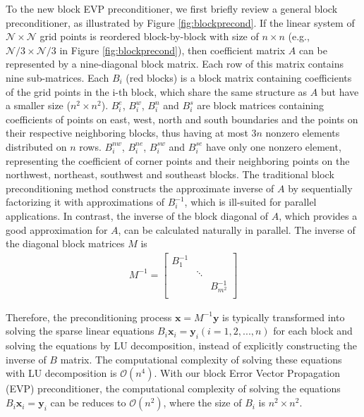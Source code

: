 To the new block EVP preconditioner, we first briefly review a general block preconditioner, as illustrated by Figure \ref{fig:blockprecond}.  If the linear system of $\mathcal{N} \times \mathcal{N}$ grid points is reordered block-by-block with size of $n\times n$ (e.g., $\mathcal{N}/3\times \mathcal{N}/3$ in Figure \ref{fig:blockprecond}), then coefficient matrix $A$ can be represented by a nine-diagonal block matrix. Each row of this matrix contains nine sub-matrices.  Each $B_i$ (red blocks) is a block matrix containing coefficients of the grid points in the i-th block, which share the same structure as $A$ but have a smaller size ($n^2\times n^2$).  $B_i^e$, $B_i^w$, $B_i^n$ and $B_i^s$ are block matrices containing coefficients of points on east, west, north and south boundaries and the points on their respective neighboring blocks, thus having at most $3n$ nonzero elements distributed on $n$ rows. $B_i^{nw}$, $B_i^{ne}$, $B_i^{sw}$ and $B_i^{se}$ have only one nonzero element, representing the coefficient of corner points and their neighboring points on the northwest, northeast, southwest and southeast blocks.  The traditional block preconditioning method constructs the approximate inverse of $A$ by sequentially factorizing it with approximations of $B_i^{-1}$, which is ill-suited for parallel applications.  In contrast, the inverse of the block diagonal of $A$, which provides a good approximation for $A$, can be calculated naturally in parallel.  The inverse of the diagonal block matrices $M$  is
\begin{eqnarray*}
M^{-1}=    \left [
        \begin{array}{ccccccc}
        B_1^{-1} &   &  \\
         & \ddots&  \\
        &   &  B_{m^2}^{-1} \\
    \end{array}
    \right ]
\end{eqnarray*}

Therefore, the preconditioning process $\textbf{x}= M^{-1}\textbf{y}$ is typically transformed into solving the sparse linear equations $B_i \textbf{x}_i = \textbf{y}_i (i=1,2,...,n)$ for each block and solving the equations by LU decomposition, instead of explicitly constructing the inverse of $B$ matrix. The computational complexity of solving these equations with LU decomposition is $\mathcal{O}(n^4)$. With our block Error Vector
Propagation (EVP) preconditioner, the computational complexity of solving the equations $B_i \textbf{x}_i =\textbf{y}_i$ can be reduces to $\mathcal{O}(n^2)$, where the size of $B_i$ is $n^2\times n^2$.

